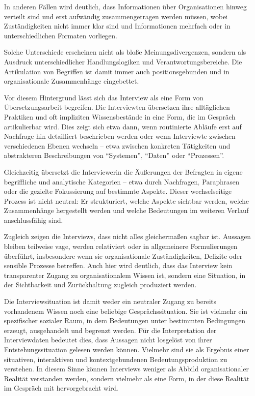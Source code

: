 \documentclass[a4paper,
fontsize=11pt,
oneside,
numbers=noperiodatend,
parskip=half-,
bibliography=totoc,
final
]{scrartcl}
\begin{document}
In anderen Fällen wird deutlich, dass Informationen über Organisationen
hinweg verteilt sind und erst aufwändig zusammengetragen werden müssen,
wobei Zuständigkeiten nicht immer klar sind und Informationen mehrfach
oder in unterschiedlichen Formaten vorliegen.

Solche Unterschiede erscheinen nicht als bloße Meinungsdivergenzen,
sondern als Ausdruck unterschiedlicher Handlungslogiken und
Verantwortungsbereiche. Die Artikulation von Begriffen ist damit immer
auch positionsgebunden und in organisationale Zusammenhänge eingebettet.

Vor diesem Hintergrund lässt sich das Interview als eine Form von
Übersetzungsarbeit begreifen. Die Interviewten übersetzen ihre
alltäglichen Praktiken und oft impliziten Wissensbestände in eine Form,
die im Gespräch artikulierbar wird. Dies zeigt sich etwa dann, wenn
routinierte Abläufe erst auf Nachfrage hin detailliert beschrieben
werden oder wenn Interviewte zwischen verschiedenen Ebenen wechseln --
etwa zwischen konkreten Tätigkeiten und abstrakteren Beschreibungen von
\enquote{Systemen}, \enquote{Daten} oder \enquote{Prozessen}.

Gleichzeitig übersetzt die Interviewerin die Äußerungen der Befragten in
eigene begriffliche und analytische Kategorien -- etwa durch Nachfragen,
Paraphrasen oder die gezielte Fokussierung auf bestimmte Aspekte. Dieser
wechselseitige Prozess ist nicht neutral: Er strukturiert, welche
Aspekte sichtbar werden, welche Zusammenhänge hergestellt werden und
welche Bedeutungen im weiteren Verlauf anschlussfähig sind.

Zugleich zeigen die Interviews, dass nicht alles gleichermaßen sagbar
ist. Aussagen bleiben teilweise vage, werden relativiert oder in
allgemeinere Formulierungen überführt, insbesondere wenn sie
organisationale Zuständigkeiten, Defizite oder sensible Prozesse
betreffen. Auch hier wird deutlich, dass das Interview kein
transparenter Zugang zu organisationalem Wissen ist, sondern eine
Situation, in der Sichtbarkeit und Zurückhaltung zugleich produziert
werden.

Die Interviewsituation ist damit weder ein neutraler Zugang zu bereits
vorhandenem Wissen noch eine beliebige Gesprächssituation. Sie ist
vielmehr ein spezifischer sozialer Raum, in dem Bedeutungen unter
bestimmten Bedingungen erzeugt, ausgehandelt und begrenzt werden. Für
die Interpretation der Interviewdaten bedeutet dies, dass Aussagen nicht
losgelöst von ihrer Entstehungssituation gelesen werden können. Vielmehr
sind sie als Ergebnis einer situativen, interaktiven und
kontextgebundenen Bedeutungsproduktion zu verstehen. In diesem Sinne
können Interviews weniger als Abbild organisationaler Realität
verstanden werden, sondern vielmehr als eine Form, in der diese Realität
im Gespräch mit hervorgebracht wird.
\end{document}
